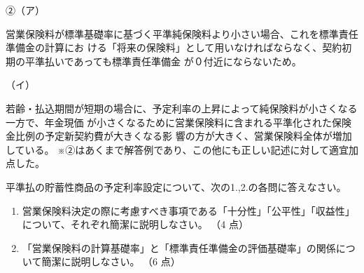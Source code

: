 \documentclass[report,gutter=10mm,fore-edge=10mm,uplatex,dvipdfmx]{jlreq}
\begin{document}
②（ア）

営業保険料が標準基礎率に基づく平準純保険料より小さい場合、これを標準責任準備金の計算にお
ける「将来の保険料」として用いなければならなく、契約初期の平準払いであっても標準責任準備金
が０付近にならないため。

（イ）

若齢・払込期間が短期の場合に、予定利率の上昇によって純保険料が小さくなる一方で、年金現価
が小さくなるために営業保険料に含まれる平準化された保険金比例の予定新契約費が大きくなる影
響の方が大きく、営業保険料全体が増加している。
※②はあくまで解答例であり、この他にも正しい記述に対して適宜加点した。

平準払の貯蓄性商品の予定利率設定について、次の1.,2.の各問に答えなさい。

\begin{enumerate}
 \item  営業保険料決定の際に考慮すべき事項である「十分性」「公平性」「収益性」について、それぞれ簡潔に説明しなさい。 （4 点）
 \item 「営業保険料の計算基礎率」と「標準責任準備金の評価基礎率」の関係について簡潔に説明しなさい。 （6 点）
\end{enumerate}
\end{document}

